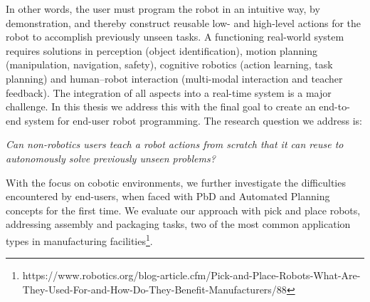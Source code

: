 In other words, the user must program the robot in an intuitive way, \eg by demonstration, and thereby construct 
reusable low- and high-level actions for the robot to accomplish previously unseen tasks.
A functioning real-world system requires solutions in perception (\eg object identification), motion planning (\eg manipulation, navigation, safety),  cognitive robotics (\eg action learning, task planning) and human–robot interaction (\eg multi-modal interaction and teacher feedback). 
The integration of all aspects into a real-time system is a major challenge.
In this thesis we address this with the final goal to create an end-to-end system for end-user robot programming.
The research question we address is:
\begin{center}
	\textit{Can non-robotics users teach a robot actions from scratch that it can reuse to autonomously solve previously unseen problems?}
\end{center}

With the focus on cobotic environments, we further investigate the difficulties encountered by end-users, when faced with PbD and Automated Planning concepts for the first time. 
We evaluate our approach with pick and place robots, addressing assembly and packaging tasks, two of the most common application types in manufacturing facilities\footnote{https://www.robotics.org/blog-article.cfm/Pick-and-Place-Robots-What-Are-They-Used-For-and-How-Do-They-Benefit-Manufacturers/88}.

%



